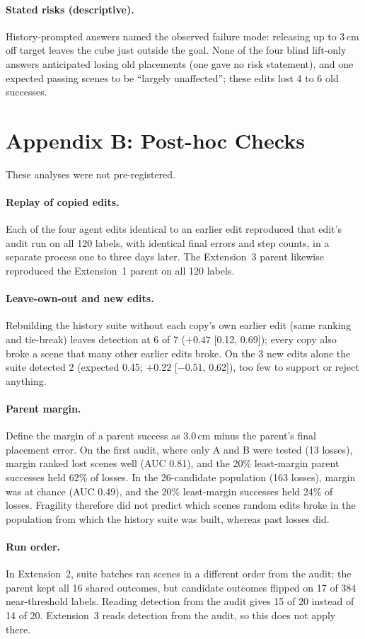 \documentclass[letterpaper]{article} %
\begin{document}
\paragraph{Stated risks (descriptive).} History-prompted answers named the observed failure mode: releasing up to 3\,cm off target leaves the cube just outside the goal. None of the four blind lift-only answers anticipated losing old placements (one gave no risk statement), and one expected passing scenes to be ``largely unaffected''; these edits lost 4 to 6 old successes.

\section{Appendix B: Post-hoc Checks}
These analyses were not pre-registered.

\paragraph{Replay of copied edits.} Each of the four agent edits identical to an earlier edit reproduced that edit's audit run on all 120 labels, with identical final errors and step counts, in a separate process one to three days later. The Extension~3 parent likewise reproduced the Extension~1 parent on all 120 labels.

\paragraph{Leave-own-out and new edits.} Rebuilding the history suite without each copy's own earlier edit (same ranking and tie-break) leaves detection at 6 of 7 ($+0.47$ [0.12, 0.69]); every copy also broke a scene that many other earlier edits broke. On the 3 new edits alone the suite detected 2 (expected 0.45; $+0.22$ [$-0.51$, 0.62]), too few to support or reject anything.

\paragraph{Parent margin.} Define the margin of a parent success as 3.0\,cm minus the parent's final placement error. On the first audit, where only A and B were tested (13 losses), margin ranked lost scenes well (AUC 0.81), and the 20\% least-margin parent successes held 62\% of losses. In the 26-candidate population (163 losses), margin was at chance (AUC 0.49), and the 20\% least-margin successes held 24\% of losses. Fragility therefore did not predict which scenes random edits broke in the population from which the history suite was built, whereas past losses did.

\paragraph{Run order.} In Extension~2, suite batches ran scenes in a different order from the audit; the parent kept all 16 shared outcomes, but candidate outcomes flipped on 17 of 384 near-threshold labels. Reading detection from the audit gives 15 of 20 instead of 14 of 20. Extension~3 reads detection from the audit, so this does not apply there.
\end{document}
